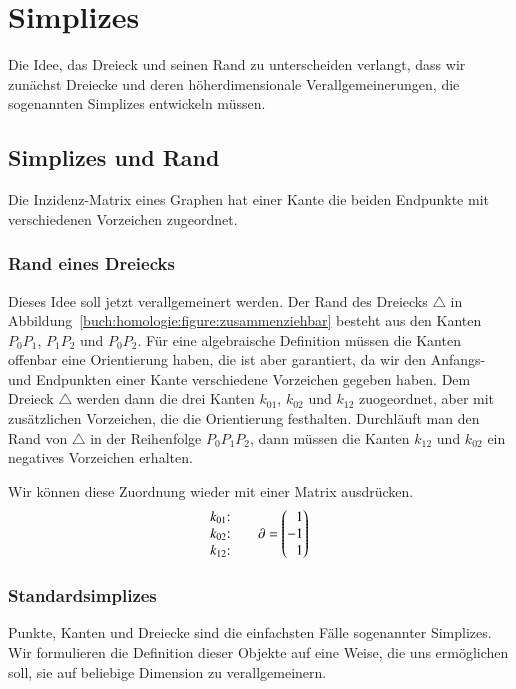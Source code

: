 %
%
%
\section{Simplizes
\label{buch:section:simplexe}}
Die Idee, das Dreieck und seinen Rand zu unterscheiden verlangt,
dass wir zunächst Dreiecke und deren höherdimensionale Verallgemeinerungen,
die sogenannten Simplizes entwickeln müssen.

\subsection{Simplizes und Rand
\label{buch:subsection:simplices}}
Die Inzidenz-Matrix eines Graphen hat einer Kante die beiden Endpunkte
mit verschiedenen Vorzeichen zugeordnet.

\subsubsection{Rand eines Dreiecks}
Dieses Idee soll jetzt verallgemeinert werden.
Der Rand des Dreiecks $\triangle$ in
Abbildung~\ref{buch:homologie:figure:zusammenziehbar}
besteht aus den Kanten $P_0P_1$, $P_1P_2$ und $P_0P_2$.
Für eine algebraische Definition müssen die Kanten offenbar eine
Orientierung haben, die ist aber garantiert, da wir den Anfangs-
und Endpunkten einer Kante verschiedene Vorzeichen gegeben haben.
Dem Dreieck $\triangle$ werden dann die drei Kanten $k_{01}$, $k_{02}$
und $k_{12}$ zuogeordnet, aber mit zusätzlichen Vorzeichen, die
die Orientierung festhalten.
Durchläuft man den Rand von $\triangle$ in der Reihenfolge $P_0P_1P_2$,
dann müssen die Kanten $k_{12}$ und $k_{02}$ ein negatives Vorzeichen
erhalten.

Wir können diese Zuordnung wieder mit einer Matrix ausdrücken.
\[
\begin{matrix}
\text{$k_{01}$:}\mathstrut\\
\text{$k_{02}$:}\mathstrut\\
\text{$k_{12}$:}\mathstrut
\end{matrix}
\qquad
\partial
=
\begin{pmatrix*}[r]
1\mathstrut\\
-1\mathstrut\\
1\mathstrut
\end{pmatrix*}
\]

\subsubsection{Standardsimplizes}
Punkte, Kanten und Dreiecke sind die einfachsten Fälle sogenannter
Simplizes.
Wir formulieren die Definition dieser Objekte auf eine Weise,
die uns ermöglichen soll, sie auf beliebige Dimension zu verallgemeinern.

